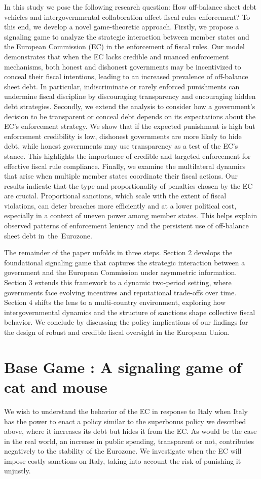 \documentclass{article}
\begin{document}
In this study we pose the following research question: How off-balance sheet debt vehicles and intergovernmental collaboration affect fiscal rules enforcement? To this end, we develop a novel game-theoretic approach.  Firstly, we propose a signaling game to analyze the strategic interaction between member states and the European Commission (EC) in the enforcement of fiscal rules. Our model demonstrates that when the EC lacks credible and nuanced enforcement mechanisms, both honest and dishonest governments may be incentivized to conceal their fiscal intentions, leading to an increased prevalence of off-balance sheet debt. In particular, indiscriminate or rarely enforced punishments can undermine fiscal discipline by discouraging transparency and encouraging hidden debt strategies.
Secondly, we extend the analysis to consider how a government’s decision to be transparent or conceal debt depends on its expectations about the EC’s enforcement strategy. We show that if the expected punishment is high but enforcement credibility is low, dishonest governments are more likely to hide debt, while honest governments may use transparency as a test of the EC’s stance. This highlights the importance of credible and targeted enforcement for effective fiscal rule compliance.
Finally, we examine the multilateral dynamics that arise when multiple member states coordinate their fiscal actions. Our results indicate that the type and proportionality of penalties chosen by the EC are crucial. Proportional sanctions, which scale with the extent of fiscal violations, can deter breaches more efficiently and at a lower political cost, especially in a context of uneven power among member states. This helps explain observed patterns of enforcement leniency and the persistent use of off-balance sheet debt in the Eurozone.


The remainder of the paper unfolds in three steps. Section 2 develops the foundational signaling game that captures the strategic interaction between a government and the European Commission under asymmetric information. Section 3 extends this framework to a dynamic two-period setting, where governments face evolving incentives and reputational trade-offs over time. Section 4 shifts the lens to a multi-country environment, exploring how intergovernmental dynamics and the structure of sanctions shape collective fiscal behavior. We conclude by discussing the policy implications of our findings for the design of robust and credible fiscal oversight in the European Union.


\section{Base Game : A signaling game of cat and mouse}
We wish to understand the behavior of the EC in response to Italy when Italy has the power to enact a policy similar to the superbonus policy we described above, where it increases its debt but hides it from the EC. As would be the case in the real world, an increase in public spending, transparent or not, contributes negatively to the stability of the Eurozone. We investigate when the EC will impose costly sanctions on Italy, taking into account the risk of punishing it unjustly.  
\end{document}
